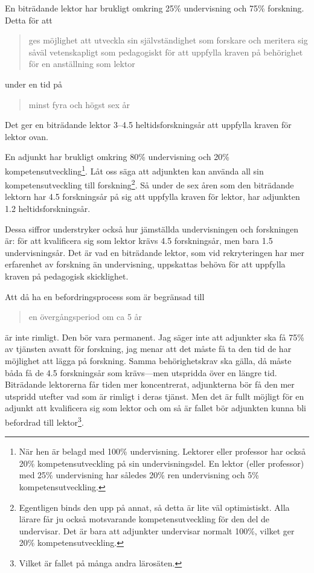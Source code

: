 \documentclass[a4paper,oneside,article,swedish]{memoir}
\begin{document}
En biträdande lektor har brukligt omkring 25\% undervisning och 75\% forskning.
Detta för att
\blockcquote[kap.~4, 12 a §]{Högskoleförordningen}{%
  ges möjlighet att utveckla sin självständighet som forskare och meritera sig 
  såväl vetenskapligt som pedagogiskt för att uppfylla kraven på behörighet för 
  en anställning som lektor%
} under en tid på
\blockcquote[kap.~4, 12 a §]{Högskoleförordningen}{%
  minst fyra och högst sex år%
}.
Det ger en biträdande lektor 3--4.5 heltidsforskningsår att uppfylla kraven för 
lektor ovan.

En adjunkt har brukligt omkring 80\% undervisning och 20\% 
kompetensutveckling\footnote{%
  När hen är belagd med 100\% undervisning.
  Lektorer eller professor har också 20\% kompetensutveckling på sin 
  undervisningsdel.
  En lektor (eller professor) med 25\% undervisning har således 20\% ren 
  undervisning och 5\% kompetensutveckling.
}.
Låt oss säga att adjunkten kan använda all sin kompetensutveckling till 
forskning\footnote{%
  Egentligen binds den upp på annat, så detta är lite väl optimistiskt.
  Alla lärare får ju också motsvarande kompetensutveckling för den del de 
  undervisar.
  Det är bara att adjunkter undervisar normalt 100\%, vilket ger 20\% 
  kompetensutveckling.
}.
Så under de sex åren som den biträdande lektorn har 4.5 forskningsår på sig att 
uppfylla kraven för lektor, har adjunkten 1.2 heltidsforskningsår.

Dessa siffror understryker också hur jämställda undervisningen och forskningen 
är:
för att kvalificera sig som lektor krävs 4.5 forskningsår, men bara 1.5 
undervisningsår.
Det är vad en biträdande lektor, som vid rekryteringen har mer erfarenhet av 
forskning än undervisning, uppskattas behöva för att uppfylla kraven på 
pedagogisk skicklighet.

Att då ha en befordringsprocess som är begränsad till
\blockcquote[s.~2]{utredning}{%
  en övergångsperiod om ca 5 år%
} är inte rimligt.
Den bör vara permanent.
Jag säger inte att adjunkter ska få 75\% av tjänsten avsatt för forskning, jag 
menar att det måste få ta den tid de har möjlighet att lägga på forskning.
Samma behörighetskrav ska gälla, då måste båda få de 4.5 forskningsår som 
krävs---men utspridda över en längre tid.
Biträdande lektorerna får tiden mer koncentrerat, adjunkterna bör få den mer 
utspridd utefter vad som är rimligt i deras tjänst.
Men det är fullt möjligt för en adjunkt att kvalificera sig som lektor och om 
så är fallet bör adjunkten kunna bli befordrad till lektor\footnote{%
  Vilket är fallet på många andra lärosäten.
}.
\end{document}
